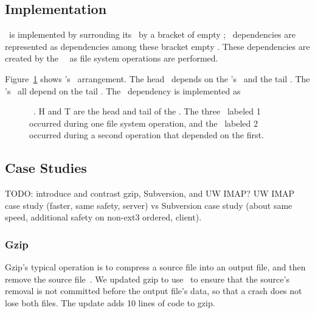 
\subsection{Implementation}
\label{sec:opgroup:implementation}

\Anopgroup\ is implemented by surrouding its \patches\ by a bracket of
empty \patches; \opgroup\ dependencies are represented as dependencies
among these bracket empty \patches.
%
These dependencies are created by the \opgroup\ \module\ as file
system operations are performed.

Figure~\ref{fig:opgroup-chdescs} shows \anopgroup's \chdesc\ arrangement.
%
The head \chdesc\ depends on the \opgroup's \chdescs\ and the tail
\chdesc.
%
The \opgroup's \chdescs\ all depend on the tail \chdesc.
%
The \opgroup\ dependency  is implemented as

\begin{figure}[htb]
\caption{\label{fig:opgroup-chdescs} \Opgroup\ \chdescs. H and T are the head
  and tail of the \opgroup.
  The three \chdescs\ labeled 1 occurred during one file system
  operation,
  and the \chdesc\ labeled 2 occurred during a second operation that
  depended on the first.}
\end{figure}

\subsection{Case Studies}
\label{sec:opgroup:casestudies}

TODO: introduce and contrast gzip, Subversion, and UW IMAP?
%
UW IMAP case study (faster, same safety, server) vs
Subversion case study (about same speed, additional safety on non-ext3
ordered, client).

\subsubsection{Gzip}
\label{sec:opgroup:gzip}

Gzip's typical operation is to compress a source file into an output file,
and then remove the source file~\cite{gzip}.
%
We updated gzip to use \opgroups\ to ensure that the source's removal
is not committed before the output file's data, so that a crash does
not lose both files. The update adds 10 lines of code to gzip.

